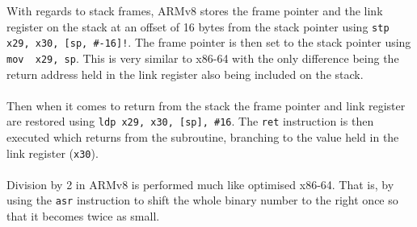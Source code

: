 \documentclass{article}
\begin{document}
\noindent With regards to stack frames, ARMv8 stores the frame pointer and the link register on the stack at an offset of 16 bytes from the stack pointer using \verb+stp	x29, x30, [sp, #-16]!+. The frame pointer is then set to the stack pointer using \verb+mov	x29, sp+. This is very similar to x86-64 with the only difference being the return address held in the link register also being included on the stack. \\ \\ \noindent Then when it comes to return from the stack the frame pointer and link register are restored using \verb+ldp	x29, x30, [sp], #16+. The \verb+ret+ instruction is then executed which returns from the subroutine, branching to the value held in the link register (\verb+x30+). \\ \\ \noindent Division by 2 in ARMv8 is performed much like optimised x86-64. That is, by using the \verb+asr+ instruction to shift the whole binary number to the right once so that it becomes twice as small.
\end{document}
